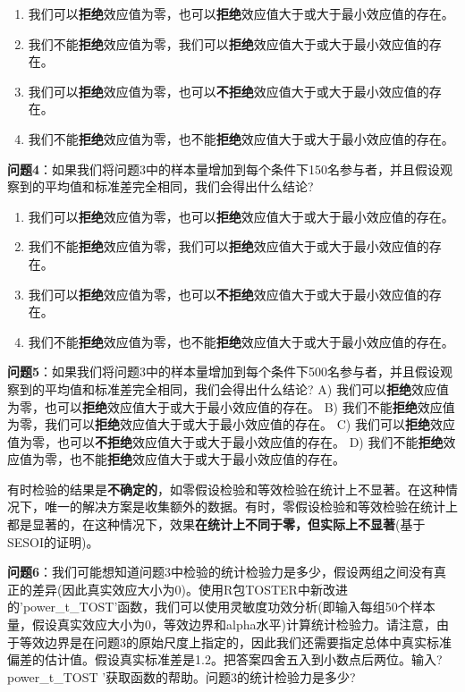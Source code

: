 \documentclass[
  letterpaper,
  DIV=11,
  numbers=noendperiod]{scrreprt}
\providecommand{\tightlist}{%
  \setlength{\itemsep}{0pt}\setlength{\parskip}{0pt}}\usepackage{longtable,booktabs,array}
\begin{document}
\begin{enumerate}
\def\labelenumi{\Alph{enumi})}
\tightlist
\item
  我们可以\textbf{拒绝}效应值为零，也可以\textbf{拒绝}效应值大于或大于最小效应值的存在。
\item
  我们不能\textbf{拒绝}效应值为零，我们可以\textbf{拒绝}效应值大于或大于最小效应值的存在。
\item
  我们可以\textbf{拒绝}效应值为零，也可以\textbf{不拒绝}效应值大于或大于最小效应值的存在。
\item
  我们不能\textbf{拒绝}效应值为零，也不能\textbf{拒绝}效应值大于或大于最小效应值的存在。
\end{enumerate}

\textbf{问题4}：如果我们将问题3中的样本量增加到每个条件下150名参与者，并且假设观察到的平均值和标准差完全相同，我们会得出什么结论?

\begin{enumerate}
\def\labelenumi{\Alph{enumi})}
\tightlist
\item
  我们可以\textbf{拒绝}效应值为零，也可以\textbf{拒绝}效应值大于或大于最小效应值的存在。
\item
  我们不能\textbf{拒绝}效应值为零，我们可以\textbf{拒绝}效应值大于或大于最小效应值的存在。
\item
  我们可以\textbf{拒绝}效应值为零，也可以\textbf{不拒绝}效应值大于或大于最小效应值的存在。
\item
  我们不能\textbf{拒绝}效应值为零，也不能\textbf{拒绝}效应值大于或大于最小效应值的存在。
\end{enumerate}

\textbf{问题5}：如果我们将问题3中的样本量增加到每个条件下500名参与者，并且假设观察到的平均值和标准差完全相同，我们会得出什么结论?
A)
我们可以\textbf{拒绝}效应值为零，也可以\textbf{拒绝}效应值大于或大于最小效应值的存在。
B)
我们不能\textbf{拒绝}效应值为零，我们可以\textbf{拒绝}效应值大于或大于最小效应值的存在。
C)
我们可以\textbf{拒绝}效应值为零，也可以\textbf{不拒绝}效应值大于或大于最小效应值的存在。
D)
我们不能\textbf{拒绝}效应值为零，也不能\textbf{拒绝}效应值大于或大于最小效应值的存在。

有时检验的结果是\textbf{不确定的}，如零假设检验和等效检验在统计上不显著。在这种情况下，唯一的解决方案是收集额外的数据。有时，零假设检验和等效检验在统计上都是显著的，在这种情况下，效果\textbf{在统计上不同于零，但实际上不显著}(基于SESOI的证明)。

\textbf{问题6}：我们可能想知道问题3中检验的统计检验力是多少，假设两组之间没有真正的差异(因此真实效应大小为0)。使用R包TOSTER中新改进的'power\_t\_TOST'函数，我们可以使用灵敏度功效分析(即输入每组50个样本量，假设真实效应大小为0，等效边界和alpha水平)计算统计检验力。请注意，由于等效边界是在问题3的原始尺度上指定的，因此我们还需要指定总体中真实标准偏差的估计值。假设真实标准差是1.2。把答案四舍五入到小数点后两位。输入?power\_t\_TOST
'获取函数的帮助。问题3的统计检验力是多少?
\end{document}
